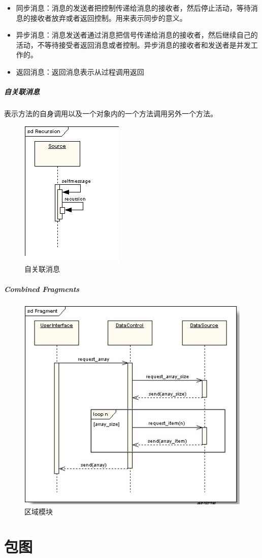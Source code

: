 \documentclass[UTF8,a4paper,12pt]{ctexbook}
\begin{document}
			\begin{itemize}
				\item 同步消息：消息的发送者把控制传递给消息的接收者，然后停止活动，等待消息的接收者放弃或者返回控制。用来表示同步的意义。
				\item 异步消息：消息发送者通过消息把信号传递给消息的接收者，然后继续自己的活动，不等待接受者返回消息或者控制。异步消息的接收者和发送者是并发工作的。
				\item 返回消息：返回消息表示从过程调用返回
			\end{itemize}
			
			\subparagraph{自关联消息}
				表示方法的自身调用以及一个对象内的一个方法调用另外一个方法。
				
				\begin{figure}[H]
					\centering
					\includegraphics[scale=1.5]{SelfMessage}
					\caption{自关联消息}
				\end{figure}
				
			\subparagraph{Combined Fragments}
				\begin{figure}[H]
					\centering
					\includegraphics[scale=1]{CombinedFragments}
					\caption{区域模块}
				\end{figure}
	\section{包图}
\end{document}
